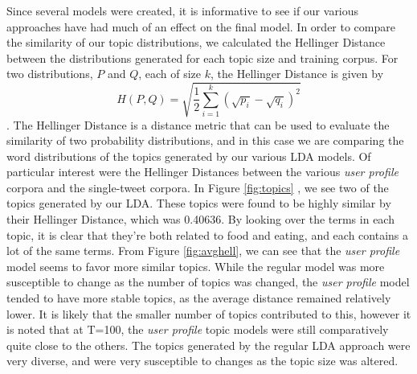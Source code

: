 \documentclass{acm_proc_article-sp}
\begin{document}
\hspace*{5mm}Since several models were created, it is informative to see if our various approaches have had much of an effect on the final model. In order to compare the similarity of our topic distributions, we calculated the Hellinger Distance between the distributions generated for each topic size and training corpus. For two distributions, $P$ and $Q$, each of size $k$, the Hellinger Distance is given by\[H(P,Q) = \sqrt{\frac{1}{2}\sum_{i=1}^{k}(\sqrt{p_{i}}-\sqrt{q_{i}})^2}\]. The Hellinger Distance is a distance metric that can be used to evaluate the similarity of two probability distributions, and in this case we are comparing the word distributions of the topics generated by our various LDA models. Of particular interest were the Hellinger Distances between the various \textit{user profile} corpora and the single-tweet corpora. In Figure \ref{fig:topics} , we see two of the topics generated by our LDA. These topics were found to be highly similar by their Hellinger Distance, which was 0.40636. By looking over the terms in each topic, it is clear that they're both related to food and eating, and each contains a lot of the same terms. From Figure \ref{fig:avghell}, we can see that the \textit{user profile} model seems to favor more similar topics. While the regular model was more susceptible to change as the number of topics was changed, the \textit{user profile} model tended to have more stable topics, as the average distance remained relatively lower. It is likely that the smaller number of topics contributed to this, however it is noted that at T=100, the \textit{user profile} topic models were still comparatively quite close to the others. The topics generated by the regular LDA approach were very diverse, and were very susceptible to changes as the topic size was altered.
\end{document}
